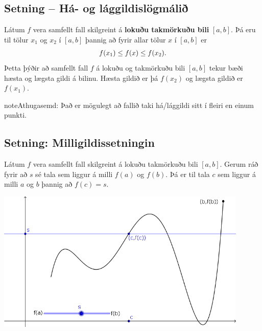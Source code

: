 \documentclass[b5paper,10pt,icelandic]{sphinxmanual}
\begin{document}
\subsection{Setning – Há- og lággildislögmálið}
\label{kafli02:setning-ha-og-laggildislogmali}\label{kafli02:ha-og-laggildislogmali}\label{kafli02:index-12}
Látum \(f\) vera samfellt fall skilgreint á \textbf{lokuðu takmörkuðu bili}
\([a,b]\). Þá eru til tölur \(x_1\) og \(x_2\) í
\([a,b]\) þannig að fyrir allar tölur \(x\) í \([a,b]\) er
\begin{gather}
\begin{split}f(x_1)\leq f(x)\leq f(x_2).\end{split}\notag
\end{gather}
Þetta þýðir að samfellt fall \(f\) á lokuðu og takmörkuðu bili
\([a,b]\) tekur bæði hæsta og lægsta gildi á bilinu. Hæsta gildið er
þá \(f(x_2)\) og lægsta gildið er \(f(x_1)\).

\begin{notice}{note}{Athugasemd:}
Það er mögulegt að fallið taki há/lággildi sitt í fleiri en einum
punkti.
\end{notice}


\subsection{Setning: Milligildissetningin}
\label{kafli02:setning-milligildissetningin}\label{kafli02:index-13}
Látum \(f\) vera samfellt fall skilgreint á lokuðu takmörkuðu bili
\([a,b]\). Gerum ráð fyrir að \(s\) sé tala sem liggur á milli
\(f(a)\) og \(f(b)\). Þá er til tala \(c\) sem liggur á
milli \(a\) og \(b\) þannig að \(f(c)=s\).


\begin{center}
\includegraphics[width=12cm,keepaspectratio=true]{10_milligildissetn.png}
\end{center}
\end{document}
